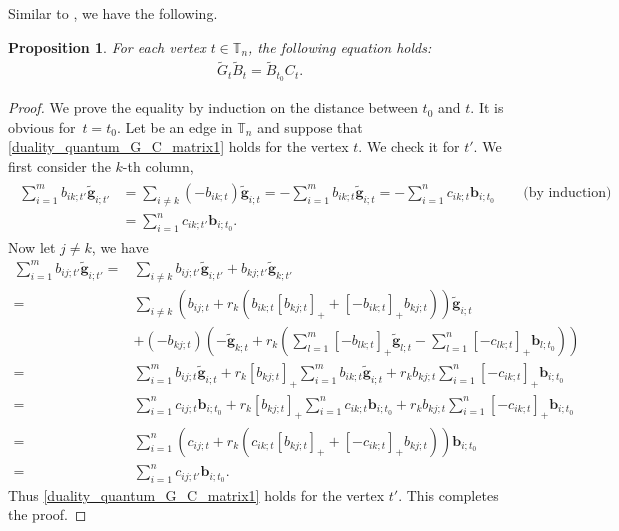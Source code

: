 \documentclass[11pt]{article}
\numberwithin{equation}{section}
\numberwithin{equation}{section}
\newtheorem{Proposition}[Theorem]{Proposition}
 { \theoremstyle{definition}
\newtheorem{Definition}[Theorem]{Definition}
\newtheorem{Note}[Theorem]{Note}
\newtheorem{Example}[Theorem]{Example}
\newtheorem{Remark}[Theorem]{Remark} }
\begin{document}
Similar to \cite[equation (6.14)]{fomin_zelevinsky_2007}, we have the following.
\begin{Proposition}
 For each vertex $t\in \mathbb{T}_n$, the following equation holds:
 \begin{align}\label{duality_quantum_G_C_matrix1}
 \tilde{G}_{t}\tilde{B}_{t}=\tilde{B}_{t_0}C_{t}.
 \end{align}
\end{Proposition}
\begin{proof}

 We prove the equality by induction on the distance between $t_0$ and $t$.
 It is obvious for~${t=t_0}$. Let  be an edge in $\mathbb{T}_n$ and suppose that \eqref{duality_quantum_G_C_matrix1} holds for the vertex $t$. We check it for $t'$. We first consider the $k$-th column,
 \begin{align*}
 \begin{aligned}
 \sum\limits^{m}_{i=1}b_{ik;t'}\mathbf{\tilde{g}}_{i;t'}
 &=\sum\limits_{i\neq k}(-b_{ik;t})\mathbf{\tilde{g}}_{i;t}=-\sum\limits^{m}_{i=1}b_{ik;t}\mathbf{\tilde{g}}_{i;t}=-\sum\limits^{n}_{i=1}c_{ik;t}\mathbf{b}_{i;t_0}\qquad
 \text{(by induction)}\\
 &=\sum\limits^{n}_{i=1}c_{ik;t'}\mathbf{b}_{i;t_0}.
 \end{aligned}
 \end{align*}
 Now let $j\neq k$, we have
 \begin{align*}
 \sum\limits^{m}_{i=1}b_{ij;t'}\mathbf{\tilde{g}}_{i;t'}
 ={}&\sum\limits_{i\neq k}b_{ij;t'}\mathbf{\tilde{g}}_{i;t'}+b_{kj;t'}\mathbf{\tilde{g}}_{k;t'}\\
 ={}&\sum\limits_{i\neq k}(b_{ij;t}+r_{k}(b_{ik;t}[b_{kj;t}]_{+}+[-b_{ik;t}]_{+}b_{kj;t}))\mathbf{\tilde{g}}_{i;t}\\
 & +(-b_{kj;t})\left(-\mathbf{\tilde{g}}_{k;t}+r_{k}\left(\sum\limits^{m}_{l=1}[-b_{lk;t}]_{+}\mathbf{\tilde{g}}_{l;t}-\sum\limits^{n}_{l=1}[-c_{lk;t}]_{+}\mathbf{b}_{l;t_0}\right)\right)\\
 ={}&\sum\limits^{m}_{i=1}b_{ij;t}\mathbf{\tilde{g}}_{i;t}+r_{k}[b_{kj;t}]_{+}\sum\limits^{m}_{i=1}b_{ik;t}\mathbf{\tilde{g}}_{i;t}+r_{k}b_{kj;t}\sum\limits^{n}_{i=1}[-c_{ik;t}]_{+}\mathbf{b}_{i;t_0}\\
 ={}&\sum\limits_{i=1}^{n}c_{ij;t}\mathbf{b}_{i;t_0}+r_{k}[b_{kj;t}]_{+}\sum\limits^{n}_{i=1}c_{ik;t}\mathbf{b}_{i;t_0}+r_{k}b_{kj;t}\sum\limits^{n}_{i=1}[-c_{ik;t}]_{+}\mathbf{b}_{i;t_0}\\
 ={}&\sum\limits_{i=1}^{n}(c_{ij;t}+r_{k}(c_{ik;t}[b_{kj;t}]_{+}+[-c_{ik;t}]_{+}b_{kj;t}))\mathbf{b}_{i;t_0}\\
 ={}&\sum\limits_{i=1}^{n}c_{ij;t'}\mathbf{b}_{i;t_0}.
 \end{align*}
 Thus \eqref{duality_quantum_G_C_matrix1} holds for the vertex $t'$. This completes the proof.
\end{proof}
\end{document}
